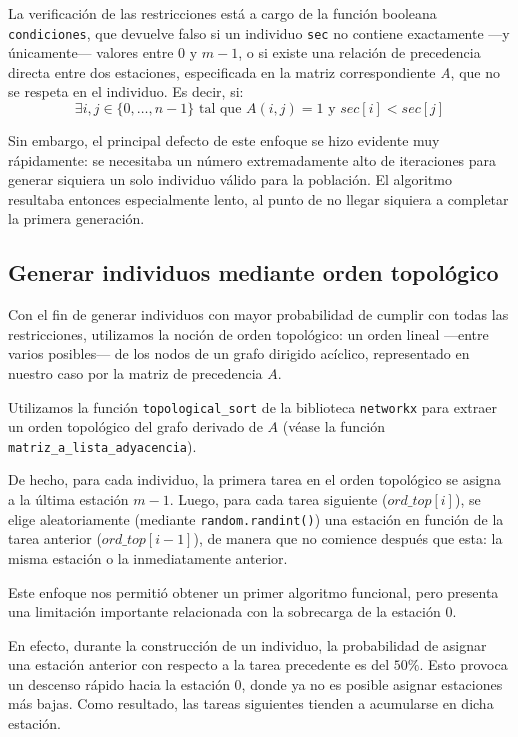\documentclass[12pt,a4paper]{report}
\begin{document}
La verificación de las restricciones está a cargo de la función booleana \texttt{condiciones}, que devuelve falso si un individuo \texttt{sec} no contiene exactamente —y únicamente— valores entre $0$ y $m-1$, o si existe una relación de precedencia directa entre dos estaciones, especificada en la matriz correspondiente \textit{A}, que no se respeta en el individuo. Es decir, si:
\[
\exists i,j \in \{0,\dots,n-1\} \text{ tal que } A(i,j) = 1 \text{ y } sec[i] < sec[j]
\]

Sin embargo, el principal defecto de este enfoque se hizo evidente muy rápidamente: se necesitaba un número extremadamente alto de iteraciones para generar siquiera un solo individuo válido para la población.
El algoritmo resultaba entonces especialmente lento, al punto de no llegar siquiera a completar la primera generación.

\subsection*{Generar individuos mediante orden topológico}

Con el fin de generar individuos con mayor probabilidad de cumplir con todas las restricciones, utilizamos la noción de orden topológico: un orden lineal —entre varios posibles— de los nodos de un grafo dirigido acíclico, representado en nuestro caso por la matriz de precedencia $A$. 

Utilizamos la función \texttt{topological\_sort} de la biblioteca \texttt{networkx} para extraer un orden topológico del grafo derivado de $A$ (véase la función \texttt{matriz\_a\_lista\_adyacencia}).

De hecho, para cada individuo, la primera tarea en el orden topológico se asigna a la última estación $m-1$. Luego, para cada tarea siguiente ($ord\_top[i]$), se elige aleatoriamente (mediante \texttt{random.randint()}) una estación en función de la tarea anterior ($ord\_top[i-1]$), de manera que no comience después que esta: la misma estación o la inmediatamente anterior.

Este enfoque nos permitió obtener un primer algoritmo funcional, pero presenta una limitación importante relacionada con la sobrecarga de la estación $0$.

En efecto, durante la construcción de un individuo, la probabilidad de asignar una estación anterior con respecto a la tarea precedente es del $50\%$. Esto provoca un descenso rápido hacia la estación $0$, donde ya no es posible asignar estaciones más bajas. Como resultado, las tareas siguientes tienden a acumularse en dicha estación.
\end{document}
